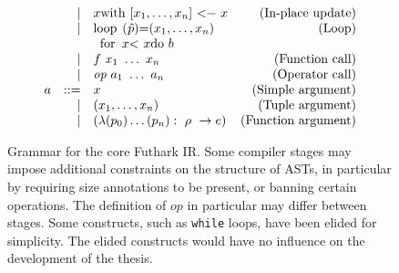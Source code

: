 \begin{figure*}
$$\begin{array}{lrlr}
      & | & \mbox{\lstinline[mathescape]!$x$ with [$x_{1},\ldots,x_{n}$] <-\ $x$!} &\mbox{(In-place update)}\\
      & | & \mbox{\lstinline[mathescape]!loop ($\hat{p}$)=($x_{1},\ldots,x_{n}$)!}  &  \mbox{(Loop)} \\
      &   & \mbox{\lstinline[mathescape]!\ for\ $x$ <\ $x$ do\ $b$!}\\
      & | & f~x_{1}~\ldots~x_{n} & \mbox{(Function call)}\\
      & | & \emph{op}~a_{1}~\ldots~a_{n} & \mbox{(Operator call)} \\
    a & ::= & x & \mbox{(Simple argument)} \\
      & |   & (x_{1}, \ldots, x_{n}) & \mbox{(Tuple argument)} \\
      & |   & (\Fn{\tty}{\Par{p_{0}} \ldots \Par{p_{n}}}{e}) & \mbox{(Function argument)}
  \end{array}
  $$

  \caption{Grammar for the core Futhark IR.  Some compiler stages may
    impose additional constraints on the structure of ASTs, in
    particular by requiring size annotations to be present, or banning
    certain operations.  The definition of $op$ in particular may
    differ between stages.  Some constructs, such as \lstinline{while}
    loops, have been elided for simplicity.  The elided constructs
    would have no influence on the development of the thesis.}
  \label{fig:futhark-ir}
\end{figure*}

